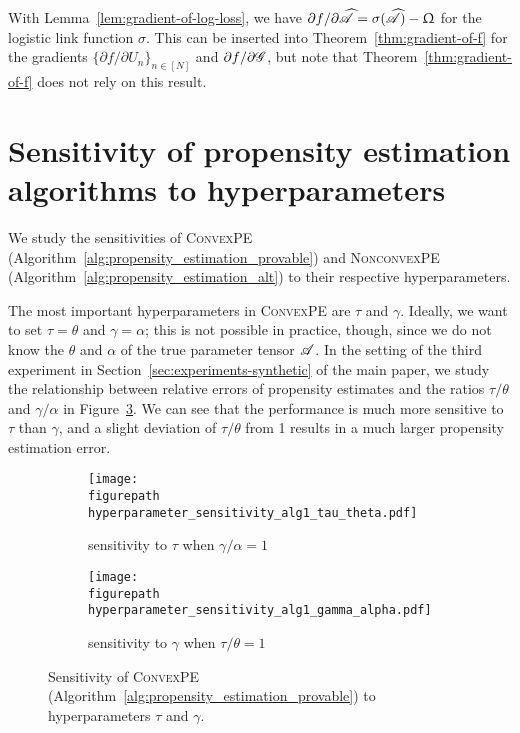 \documentclass{article}
\newcommand{\T}[2][]{#1\mathscr{\MakeUppercase{#2}}}
\theoremstyle{plain}
\def \figurepath {figures/}
\begin{document}
With Lemma~\ref{lem:gradient-of-log-loss}, we have $\partial f / \partial \widehat{\T{A}} = \sigma(\widehat{\T{A}}) - \Upomega$ for the logistic link function $\sigma$. 
This can be inserted into Theorem~\ref{thm:gradient-of-f} for the gradients $\{\partial f / \partial U_n\}_{n \in [N]}$ and $\partial f / \partial \T{G}$, but note that Theorem~\ref{thm:gradient-of-f} does not rely on this result.

\section{Sensitivity of propensity estimation algorithms to hyperparameters}
\label{sec:algorithm_sensitivity}
We study the sensitivities of \textsc{ConvexPE} (Algorithm~\ref{alg:propensity_estimation_provable}) and \textsc{NonconvexPE} (Algorithm~\ref{alg:propensity_estimation_alt}) to their respective hyperparameters. 

The most important hyperparameters in \textsc{ConvexPE} are $\tau$ and $\gamma$.
Ideally, we want to set $\tau=\theta$ and $\gamma=\alpha$; this is not possible in practice, though, since we do not know the $\theta$ and $\alpha$ of the true parameter tensor $\T{A}$. 
In the setting of the third experiment in Section~\ref{sec:experiments-synthetic} of the main paper, we study the relationship between relative errors of propensity estimates and the ratios $\tau / \theta$ and $\gamma / \alpha$ in Figure~\ref{fig:prox-prox-hyperparameter-sensitivity}.
We can see that the performance is much more sensitive to $\tau$ than $\gamma$, and a slight deviation of $\tau / \theta$ from 1 results in a much larger propensity estimation error. 

\begin{figure}
	\centering
\begin{subfigure}[t]{.28\linewidth}
	\texttt{[image: \\figurepath hyperparameter\_sensitivity\_alg1\_tau\_theta.pdf]}
	\caption{sensitivity to $\tau$ when $\gamma / \alpha=1$}
\label{fig:prox-prox-hyperparameter-sensitivity-tau}	
\end{subfigure}
\hspace{.03\linewidth}
\begin{subfigure}[t]{.28\linewidth}
	\texttt{[image: \\figurepath hyperparameter\_sensitivity\_alg1\_gamma\_alpha.pdf]}
	\caption{sensitivity to $\gamma$ when $\tau / \theta=1$}
\label{fig:prox-prox-hyperparameter-sensitivity-gamma}	
\end{subfigure}
	\caption{Sensitivity of \textsc{ConvexPE} (Algorithm~\ref{alg:propensity_estimation_provable}) to hyperparameters $\tau$ and $\gamma$.}
	\label{fig:prox-prox-hyperparameter-sensitivity}
\end{figure}
\end{document}
